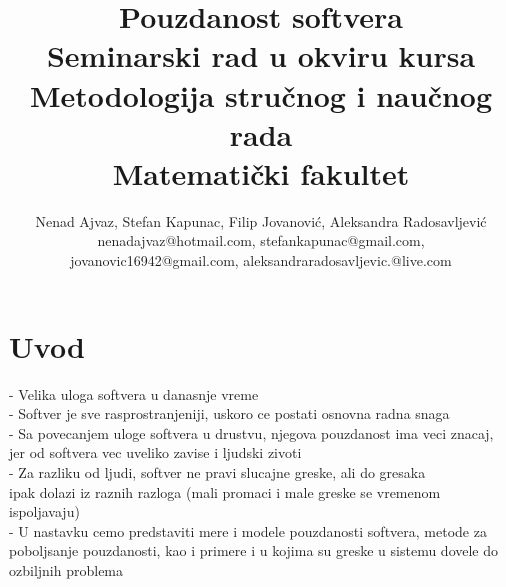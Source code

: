 \documentclass[a4paper]{article}
\begin{document}
\title{Pouzdanost softvera\\ \small{Seminarski rad u okviru kursa\\Metodologija stručnog i naučnog rada\\ Matematički fakultet}}

\author{Nenad Ajvaz, Stefan Kapunac, Filip Jovanović, Aleksandra Radosavljević\\ nenadajvaz@hotmail.com, stefankapunac@gmail.com, \\jovanovic16942@gmail.com, aleksandraradosavljevic.@live.com}


\maketitle


\tableofcontents

\newpage

\section{Uvod}
\label{sec:uvod}

- Velika uloga softvera u danasnje vreme \\
- Softver je sve rasprostranjeniji, uskoro ce postati osnovna radna snaga \\
- Sa povecanjem uloge softvera u drustvu, njegova pouzdanost ima veci znacaj, jer
od softvera vec uveliko zavise i ljudski zivoti \\
- Za razliku od ljudi, softver ne pravi slucajne greske, ali do gresaka \\
ipak dolazi iz raznih razloga (mali promaci i male greske se vremenom ispoljavaju) \\
- U nastavku cemo predstaviti mere i modele pouzdanosti softvera, metode za poboljsanje pouzdanosti, kao i primere i u kojima su greske u sistemu dovele do ozbiljnih problema
\end{document}
